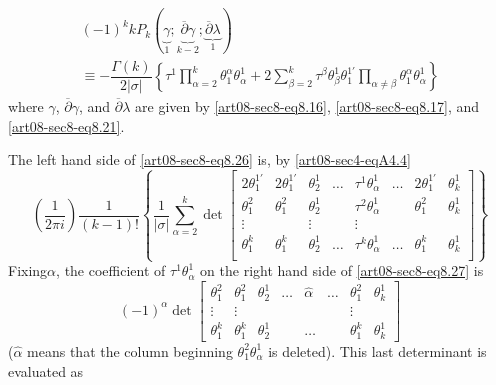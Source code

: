 \begin{gather*}
(-1)^{k}kP_{k}(\underbrace{\gamma}_{1}; \underbrace{\overline{\partial}\gamma}_{k-2}; \underbrace{\overline{\partial}\lambda}_{1})\\
\equiv - \dfrac{\Gamma(k)}{2|\sigma|}\left\{\tau^{1}\prod\limits^{k}_{\alpha=2}\theta^{\alpha}_{1}\theta^{1}_{\alpha}+2\sum\limits^{k}_{\beta=2}\tau^{\beta}\theta^{1}_{\beta}\theta^{1'}_{1}\prod\limits_{\alpha\neq \beta}\theta^{\alpha}_{1}\theta^{1}_{\alpha}\right\}\tag{8.26}\label{art08-sec8-eq8.26}
\end{gather*}
where $\gamma$, $\overline{\partial}\gamma$, and $\overline{\partial}\lambda$ are given by \eqref{art08-sec8-eq8.16}, \eqref{art08-sec8-eq8.17}, and \eqref{art08-sec8-eq8.21}.

The left hand side of \eqref{art08-sec8-eq8.26} is, by \eqref{art08-sec4-eqA4.4}
{{\fontsize{9pt}{11pt}\selectfont
\begin{equation*}
\left(\dfrac{1}{2\pi i}\right)\dfrac{1}{(k-1)!}\left\{\dfrac{1}{|\sigma|}\sum\limits^{k}_{\alpha=2}\det 
\begin{bmatrix}
2\theta^{1'}_{1} & 2\theta^{1'}_{1} & \theta^{1}_{2} & \ldots & \tau^{1}\theta^{1}_{\alpha} & \ldots & 2\theta^{1'}_{1} & \theta^{1}_{k}\\
\theta^{2}_{1} & \theta^{2}_{1} & \theta^{1}_{2} &  & \tau^{2}\theta^{1}_{\alpha} & & \theta^{2}_{1} & \theta^{1}_{k}\\
\vdots & & \vdots & & \vdots & & &\\
\theta^{k}_{1} & \theta^{k}_{1} & \theta^{1}_{2} & \ldots & \tau^{k}\theta^{1}_{\alpha} & \ldots & \theta^{k}_{1} & \theta^{1}_{k}\\
\end{bmatrix}\right\}\tag{8.27}\label{art08-sec8-eq8.27}
\end{equation*}}\relax}
Fixing\pageoriginale $\alpha$, the coefficient of $\tau^{1}\theta^{1}_{\alpha}$ on the right hand side of \eqref{art08-sec8-eq8.27} is
$$
(-1)^{\alpha}\det
\begin{bmatrix}
\theta^{2}_{1} & \theta^{2}_{1} & \theta^{1}_{2} & \ldots & \widehat{\alpha} & \ldots & \theta^{2}_{1} & \theta^{1}_{k}\\
\vdots & \vdots & & & & & \vdots & \\
\theta^{k}_{1} & \theta^{k}_{1} & \theta^{1}_{2} & & \ldots & & \theta^{k}_{1} & \theta^{1}_{k}
\end{bmatrix}
$$
($\widehat{\alpha}$ means that the column beginning $\theta^{2}_{1}\theta^{1}_{\alpha}$ is deleted). This last determinant is evaluated as
